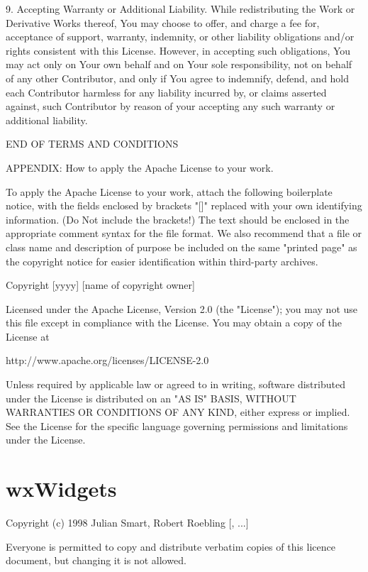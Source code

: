 \documentclass[twoside]{tceusermanual}
\begin{document}
   9. Accepting Warranty or Additional Liability. While redistributing
      the Work or Derivative Works thereof, You may choose to offer,
      and charge a fee for, acceptance of support, warranty, indemnity,
      or other liability obligations and/or rights consistent with this
      License. However, in accepting such obligations, You may act only
      on Your own behalf and on Your sole responsibility, not on behalf
      of any other Contributor, and only if You agree to indemnify,
      defend, and hold each Contributor harmless for any liability
      incurred by, or claims asserted against, such Contributor by reason
      of your accepting any such warranty or additional liability.

   END OF TERMS AND CONDITIONS

   APPENDIX: How to apply the Apache License to your work.

      To apply the Apache License to your work, attach the following
      boilerplate notice, with the fields enclosed by brackets "[]"
      replaced with your own identifying information. (Do Not include
      the brackets!)  The text should be enclosed in the appropriate
      comment syntax for the file format. We also recommend that a
      file or class name and description of purpose be included on the
      same "printed page" as the copyright notice for easier
      identification within third-party archives.

   Copyright [yyyy] [name of copyright owner]

   Licensed under the Apache License, Version 2.0 (the "License");
   you may not use this file except in compliance with the License.
   You may obtain a copy of the License at

       http://www.apache.org/licenses/LICENSE-2.0

   Unless required by applicable law or agreed to in writing, software
   distributed under the License is distributed on an "AS IS" BASIS,
   WITHOUT WARRANTIES OR CONDITIONS OF ANY KIND, either express or implied.
   See the License for the specific language governing permissions and
   limitations under the License.

\section{wxWidgets}

Copyright (c) 1998 Julian Smart, Robert Roebling [, ...]

Everyone is permitted to copy and distribute verbatim copies
of this licence document, but changing it is not allowed.
\end{document}
